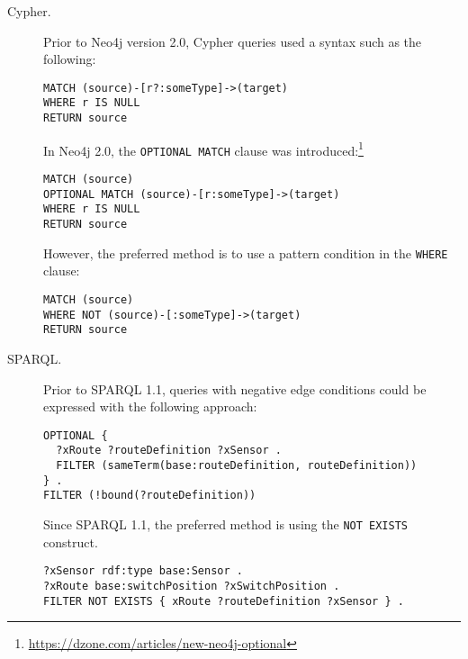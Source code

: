 \begin{description}
\item[Cypher.]
Prior to Neo4j version 2.0, Cypher queries used a syntax such as the following:

\begin{minipage}{\linewidth}
\begin{lstlisting}[language=cypher]
MATCH (source)-[r?:someType]->(target)
WHERE r IS NULL
RETURN source
\end{lstlisting}
\end{minipage}

In Neo4j 2.0, the \lstinline[language=cypher]{OPTIONAL MATCH} clause was introduced:\footnote{\url{https://dzone.com/articles/new-neo4j-optional}}

\begin{minipage}{\linewidth}
\begin{lstlisting}[language=cypher]
MATCH (source)
OPTIONAL MATCH (source)-[r:someType]->(target)
WHERE r IS NULL
RETURN source
\end{lstlisting}
\end{minipage}

However, the preferred method is to use a pattern condition in the \lstinline[language=cypher]{WHERE} clause:

\begin{minipage}{\linewidth}
\begin{lstlisting}[language=cypher]
MATCH (source)
WHERE NOT (source)-[:someType]->(target)
RETURN source
\end{lstlisting}
\end{minipage}

\item[SPARQL.]
Prior to SPARQL 1.1, queries with negative edge conditions could be expressed with the following approach:

\begin{minipage}{\linewidth}
\begin{lstlisting}[language=sparql]
OPTIONAL {
  ?xRoute ?routeDefinition ?xSensor .
  FILTER (sameTerm(base:routeDefinition, routeDefinition))
} .
FILTER (!bound(?routeDefinition))
\end{lstlisting}
\end{minipage}

Since SPARQL 1.1, the preferred method is using the \lstinline[language=sparql]{NOT EXISTS} construct.

\begin{minipage}{\linewidth}
\begin{lstlisting}[language=sparql]
?xSensor rdf:type base:Sensor .
?xRoute base:switchPosition ?xSwitchPosition .
FILTER NOT EXISTS { xRoute ?routeDefinition ?xSensor } .
\end{lstlisting}
\end{minipage}


\end{description}
